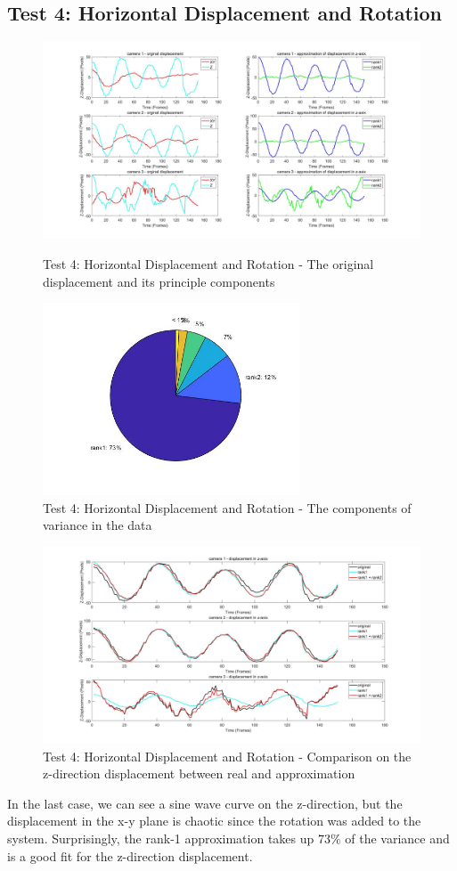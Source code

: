 \documentclass{article}
\begin{document}
\subsection{Test 4: Horizontal Displacement and Rotation}
\begin{figure}[h]
    \centerline{\includegraphics[width=8in]{case41.jpg}}
    \caption{Test 4: Horizontal Displacement and Rotation - The original displacement and its principle components}
    \centerline{\includegraphics[width=3in]{case42.jpg}}
    \caption{Test 4: Horizontal Displacement and Rotation - The components of variance in the data}
\end{figure}
\begin{figure}[h]
    \centerline{\includegraphics[width=8in]{case43.jpg}}
    \caption{Test 4: Horizontal Displacement and Rotation - Comparison on the z-direction displacement between real and approximation}
\end{figure}
In the last case, we can see a sine wave curve on the z-direction, but the displacement in the x-y plane is chaotic since the rotation was added to the system. Surprisingly, the rank-1 approximation takes up $73\%$ of the variance and is a good fit for the z-direction displacement.
\end{document}
